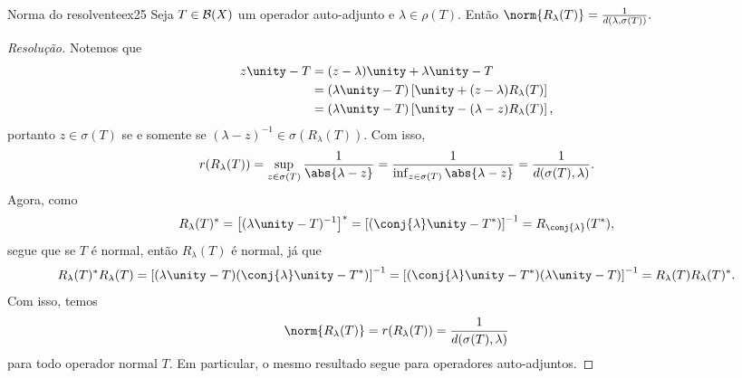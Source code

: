 \begin{exercício}{Norma do resolvente}{ex25}
  Seja \(T \in \mathcal{B}(X)\) um operador auto-adjunto e \(\lambda \in \rho(T).\) Então \(\norm{R_\lambda(T)} = \frac{1}{d(\lambda, \sigma(T))}.\)
\end{exercício}
\begin{proof}[Resolução]
  Notemos que
  \begin{align*}
    z \unity - T &= (z - \lambda)\unity + \lambda \unity - T\\
                 &= (\lambda\unity - T)\left[\unity + (z - \lambda)R_\lambda(T)\right]\\
                 &= (\lambda \unity - T)\left[\unity - (\lambda - z)R_\lambda(T)\right],
  \end{align*}
  portanto \(z \in \sigma(T)\) se e somente se \((\lambda - z)^{-1} \in \sigma(R_{\lambda}(T)).\) Com isso,
  \begin{equation*}
    r(R_{\lambda}(T)) = \sup_{z \in \sigma(T)}{\frac{1}{\abs{\lambda - z}}} = \frac{1}{\inf_{z \in \sigma(T)}{\abs{\lambda - z}}} = \frac{1}{d(\sigma(T),\lambda)}.
  \end{equation*}
  Agora, como
  \begin{equation*}
    R_\lambda(T)^* = \left[(\lambda \unity - T)^{-1}\right]^* = \left[(\conj{\lambda} \unity - T^*)\right]^{-1} = R_{\conj{\lambda}}(T^*),
  \end{equation*}
  segue que se \(T\) é normal, então \(R_\lambda(T)\) é normal, já que
  \begin{equation*}
    R_\lambda(T)^*R_\lambda(T) = \left[(\lambda\unity - T)(\conj{\lambda}\unity - T^*)\right]^{-1} = \left[(\conj{\lambda}\unity - T^*)(\lambda\unity - T)\right]^{-1} = R_{\lambda}(T)R_\lambda(T)^*.
  \end{equation*}
  Com isso, temos
  \begin{equation*}
    \norm{R_\lambda(T)} = r(R_\lambda(T)) = \frac{1}{d(\sigma(T), \lambda)}
  \end{equation*}
  para todo operador normal \(T.\) Em particular, o mesmo resultado segue para operadores auto-adjuntos.
\end{proof}
